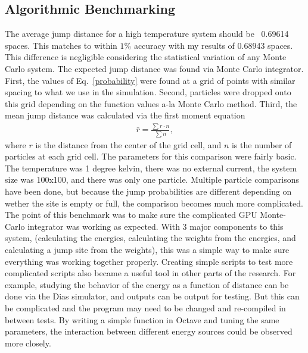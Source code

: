 \subsection{Algorithmic Benchmarking}
The average jump distance for a high temperature system should be ~0.69614 spaces. This matches to within $1\%$ accuracy with my results of 0.68943 spaces. This difference is negligible considering the statistical variation of any Monte Carlo system. The expected jump distance was found via Monte Carlo integrator. First, the values of Eq.~\ref{probability} were found at a grid of points with similar spacing to what we use in the simulation. Second, particles were dropped onto this grid depending on the function values a-la Monte Carlo method. Third, the mean jump distance was calculated via the first moment equation
\begin{eqnarray}
\bar r = \frac {\sum r \cdot n} {\sum n}, 
\label{firstMoment}
\end{eqnarray}
where $r$ is the distance from the center of the grid cell, and $n$ is the number of particles at each grid cell. The parameters for this comparison were fairly basic. The temperature was 1 degree kelvin, there was no external current, the system size was 100x100, and there was only one particle. Multiple particle comparisons have been done, but because the jump probabilities are different depending on wether the site is empty or full, the comparison becomes much more complicated. The point of this benchmark was to make sure the complicated GPU Monte-Carlo integrator was working as expected. With 3 major components to this system, (calculating the energies, calculating the weights from the energies, and calculating a jump site from the weights), this was a simple way to make sure everything was working together properly. Creating simple scripts to test more complicated scripts also became a useful tool in other parts of the research. For example, studying the behavior of the energy as a function of distance can be done via the Dias simulator, and outputs can be output for testing. But this can be complicated and the program may need to be changed and re-compiled in between tests. By writing a simple function in Octave and tuning the same parameters, the interaction between different energy sources could be observed more closely.

